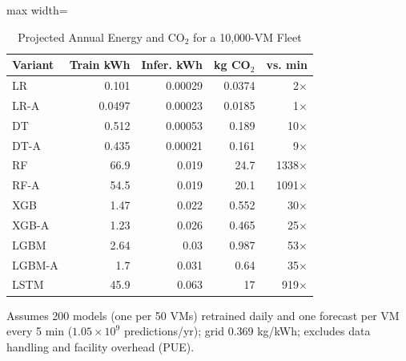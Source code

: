 \begin{table}[!htb]
\centering
\caption{Projected Annual Energy and CO$_2$ for a 10{,}000-VM Fleet}
\label{tab:fleet}
\footnotesize
\setlength{\tabcolsep}{4pt}
\begin{adjustbox}{max width=\columnwidth}
\begin{tabular}{lrrrr}
\toprule
Variant & Train kWh & Infer. kWh & kg CO$_2$ & vs. min \\
\midrule
LR & 0.101 & 0.00029 & 0.0374 & 2$\times$ \\
LR-A & 0.0497 & 0.00023 & 0.0185 & 1$\times$ \\
DT & 0.512 & 0.00053 & 0.189 & 10$\times$ \\
DT-A & 0.435 & 0.00021 & 0.161 & 9$\times$ \\
RF & 66.9 & 0.019 & 24.7 & 1338$\times$ \\
RF-A & 54.5 & 0.019 & 20.1 & 1091$\times$ \\
XGB & 1.47 & 0.022 & 0.552 & 30$\times$ \\
XGB-A & 1.23 & 0.026 & 0.465 & 25$\times$ \\
LGBM & 2.64 & 0.03 & 0.987 & 53$\times$ \\
LGBM-A & 1.7 & 0.031 & 0.64 & 35$\times$ \\
LSTM & 45.9 & 0.063 & 17 & 919$\times$ \\
\bottomrule
\end{tabular}
\end{adjustbox}
\par\vspace{3pt}
{\scriptsize Assumes 200 models (one per 50 VMs) retrained daily and one forecast per VM every 5 min ($1.05\times10^9$ predictions/yr); grid 0.369 kg/kWh; excludes data handling and facility overhead (PUE).\par}
\end{table}
